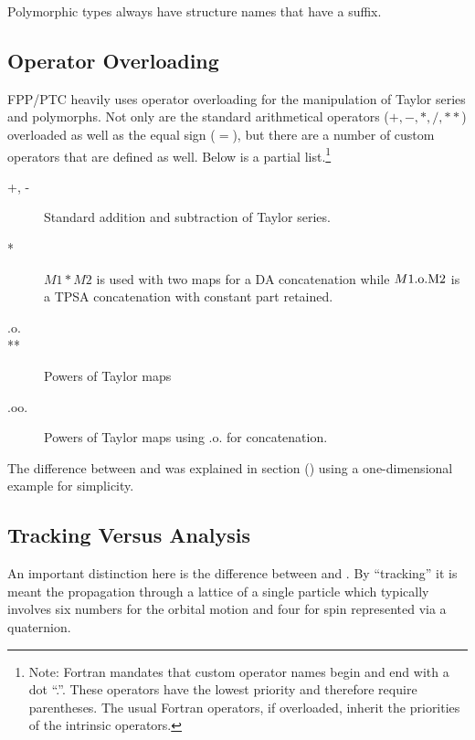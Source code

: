 \documentclass{hitec}     %
\begin{document}
{{{Polymorphic types always have structure names that have a 
suffix.

\subsection{Operator Overloading}
\label{s:overloading}

FPP/PTC heavily uses operator overloading for  the manipulation of Taylor series  and polymorphs. Not only are the standard
arithmetical operators ($+, -, *, /, **$) overloaded as well as the equal sign ($=$), but there are
a number of custom operators that are defined as well. Below is a partial list.\footnote
  {\color{h}
Note: Fortran mandates that custom operator names begin and end with a dot ``.''. These operators have the lowest priority and therefore require parentheses. The usual Fortran operators, if overloaded, inherit the priorities of the intrinsic operators. 
  }
\begin{description}
\item[+, -] \Newline
Standard addition and subtraction of Taylor series.
%
\item[*] \Newline
$M1 * M2$ is used with two maps for  {\color{h} a DA concatenation while  $M1 \rm{.o.} M2$ is a TPSA concatenation with constant part retained.}
%
\item[.o.] \Newline

\item[**] \Newline   Powers of Taylor maps

\item[.oo.] \Newline Powers of Taylor maps using .o. for concatenation.

\end{description}

The difference between  and \vn{*} was explained in section () using a one-dimensional example for simplicity.  

\subsection{Tracking Versus Analysis}
\label{s:tracking.analysis}

An important distinction here is the difference between  and . By
``tracking'' it is meant  the propagation through a lattice of a single particle {\color{h} which typically 
involves six  numbers for the orbital motion and four   for spin represented via a quaternion.}

}}}
\end{document}

